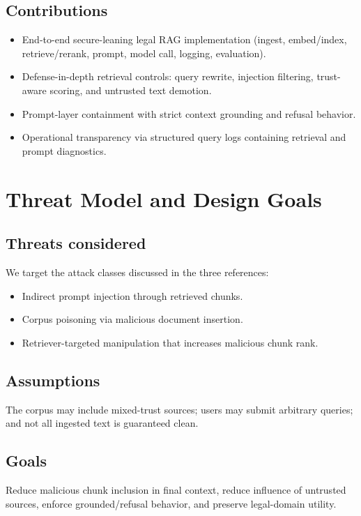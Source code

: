 \documentclass[conference]{IEEEtran}
\begin{document}
\subsection{Contributions}
\begin{itemize}
    \item End-to-end secure-leaning legal RAG implementation (ingest, embed/index, retrieve/rerank, prompt, model call, logging, evaluation).
    \item Defense-in-depth retrieval controls: query rewrite, injection filtering, trust-aware scoring, and untrusted text demotion.
    \item Prompt-layer containment with strict context grounding and refusal behavior.
    \item Operational transparency via structured query logs containing retrieval and prompt diagnostics.
\end{itemize}

\section{Threat Model and Design Goals}
\subsection{Threats considered}
We target the attack classes discussed in the three references:
\begin{itemize}
    \item Indirect prompt injection through retrieved chunks.
    \item Corpus poisoning via malicious document insertion.
    \item Retriever-targeted manipulation that increases malicious chunk rank.
\end{itemize}

\subsection{Assumptions}
The corpus may include mixed-trust sources; users may submit arbitrary queries; and not all ingested text is guaranteed clean.

\subsection{Goals}
Reduce malicious chunk inclusion in final context, reduce influence of untrusted sources, enforce grounded/refusal behavior, and preserve legal-domain utility.
\end{document}
